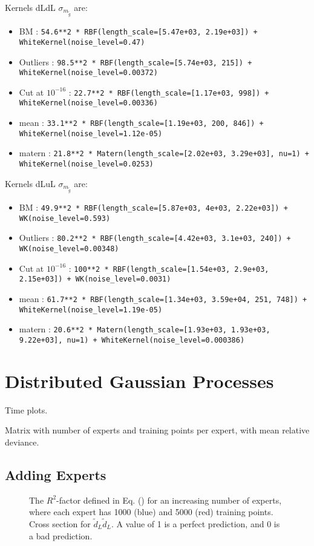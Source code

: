 \documentclass[twoside,english]{uiofysmaster}
\begin{document}
Kernels dLdL $\sigma_{m_{\tilde{g}}}$ are: 
\begin{itemize}
\item BM : \verb|54.6**2 * RBF(length_scale=[5.47e+03, 2.19e+03]) + WhiteKernel(noise_level=0.47)|
\item Outliers : \verb|98.5**2 * RBF(length_scale=[5.74e+03, 215]) + WhiteKernel(noise_level=0.00372)|
\item Cut at $10^{-16}$ : \verb|22.7**2 * RBF(length_scale=[1.17e+03, 998]) + WhiteKernel(noise_level=0.00336)|
\item mean : \verb|33.1**2 * RBF(length_scale=[1.19e+03, 200, 846]) + WhiteKernel(noise_level=1.12e-05)|
\item matern : \verb|21.8**2 * Matern(length_scale=[2.02e+03, 3.29e+03], nu=1) + WhiteKernel(noise_level=0.0253)|
\end{itemize}

Kernels dLuL $\sigma_{m_{\tilde{g}}}$ are: 
\begin{itemize}
\item BM : \verb|49.9**2 * RBF(length_scale=[5.87e+03, 4e+03, 2.22e+03]) + WK(noise_level=0.593)|
\item Outliers : \verb|80.2**2 * RBF(length_scale=[4.42e+03, 3.1e+03, 240]) + WK(noise_level=0.00348)|
\item Cut at $10^{-16}$ : \verb|100**2 * RBF(length_scale=[1.54e+03, 2.9e+03, 2.15e+03]) + WK(noise_level=0.0031)|
\item mean : \verb|61.7**2 * RBF(length_scale=[1.34e+03, 3.59e+04, 251, 748]) + WhiteKernel(noise_level=1.19e-05)|
\item matern : \verb|20.6**2 * Matern(length_scale=[1.93e+03, 1.93e+03, 9.22e+03], nu=1) + WhiteKernel(noise_level=0.000386)|
\end{itemize}

\section{Distributed Gaussian Processes}

Time plots.

Matrix with number of experts and training points per expert, with mean relative deviance.

\subsection{Adding Experts}

\begin{figure}[H]
\caption{The $R^2$-factor defined in Eq. () for an increasing number of experts, where each expert has 1000 (blue) and 5000 (red) training points. Cross section for $\tilde{d}_L \tilde{d}_L$. A value of 1 is a perfect prediction, and 0 is a bad prediction.}
\end{figure}
\end{document}
